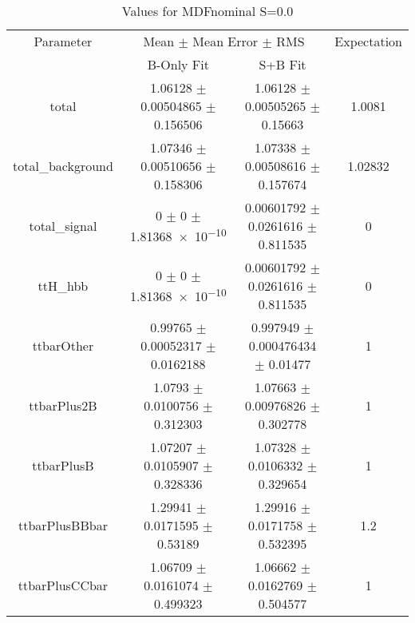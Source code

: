 \begin{table}
\centering
\caption{Values for MDFnominal S=0.0}
\begin{tabular}{cccc}
\toprule
Parameter & \multicolumn{2}{c}{Mean $\pm$ Mean Error $\pm$ RMS} & Expectation\\
 & B-Only Fit & S+B Fit & \\
\midrule
total & \num{1.06128} $\pm$ \num{0.00504865} $\pm$ \num{0.156506} & \num{1.06128} $\pm$ \num{0.00505265} $\pm$ \num{0.15663} & \num{1.0081}\\
total\_background & \num{1.07346} $\pm$ \num{0.00510656} $\pm$ \num{0.158306} & \num{1.07338} $\pm$ \num{0.00508616} $\pm$ \num{0.157674} & \num{1.02832}\\
total\_signal & \num{0} $\pm$ \num{0} $\pm$ \num{1.81368e-10} & \num{0.00601792} $\pm$ \num{0.0261616} $\pm$ \num{0.811535} & \num{0}\\
ttH\_hbb & \num{0} $\pm$ \num{0} $\pm$ \num{1.81368e-10} & \num{0.00601792} $\pm$ \num{0.0261616} $\pm$ \num{0.811535} & \num{0}\\
ttbarOther & \num{0.99765} $\pm$ \num{0.00052317} $\pm$ \num{0.0162188} & \num{0.997949} $\pm$ \num{0.000476434} $\pm$ \num{0.01477} & \num{1}\\
ttbarPlus2B & \num{1.0793} $\pm$ \num{0.0100756} $\pm$ \num{0.312303} & \num{1.07663} $\pm$ \num{0.00976826} $\pm$ \num{0.302778} & \num{1}\\
ttbarPlusB & \num{1.07207} $\pm$ \num{0.0105907} $\pm$ \num{0.328336} & \num{1.07328} $\pm$ \num{0.0106332} $\pm$ \num{0.329654} & \num{1}\\
ttbarPlusBBbar & \num{1.29941} $\pm$ \num{0.0171595} $\pm$ \num{0.53189} & \num{1.29916} $\pm$ \num{0.0171758} $\pm$ \num{0.532395} & \num{1.2}\\
ttbarPlusCCbar & \num{1.06709} $\pm$ \num{0.0161074} $\pm$ \num{0.499323} & \num{1.06662} $\pm$ \num{0.0162769} $\pm$ \num{0.504577} & \num{1}\\
\bottomrule
\end{tabular}
\end{table}